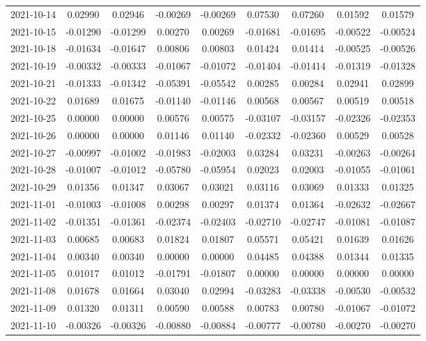\begin{footnotesize}
\begin{longtable}{lcccccccc}
2021-10-14 & 0.02990 & 0.02946 & -0.00269 & -0.00269 & 0.07530 & 0.07260 & 0.01592 & 0.01579 \\
2021-10-15 & -0.01290 & -0.01299 & 0.00270 & 0.00269 & -0.01681 & -0.01695 & -0.00522 & -0.00524 \\
2021-10-18 & -0.01634 & -0.01647 & 0.00806 & 0.00803 & 0.01424 & 0.01414 & -0.00525 & -0.00526 \\
2021-10-19 & -0.00332 & -0.00333 & -0.01067 & -0.01072 & -0.01404 & -0.01414 & -0.01319 & -0.01328 \\
2021-10-21 & -0.01333 & -0.01342 & -0.05391 & -0.05542 & 0.00285 & 0.00284 & 0.02941 & 0.02899 \\
2021-10-22 & 0.01689 & 0.01675 & -0.01140 & -0.01146 & 0.00568 & 0.00567 & 0.00519 & 0.00518 \\
2021-10-25 & 0.00000 & 0.00000 & 0.00576 & 0.00575 & -0.03107 & -0.03157 & -0.02326 & -0.02353 \\
2021-10-26 & 0.00000 & 0.00000 & 0.01146 & 0.01140 & -0.02332 & -0.02360 & 0.00529 & 0.00528 \\
2021-10-27 & -0.00997 & -0.01002 & -0.01983 & -0.02003 & 0.03284 & 0.03231 & -0.00263 & -0.00264 \\
2021-10-28 & -0.01007 & -0.01012 & -0.05780 & -0.05954 & 0.02023 & 0.02003 & -0.01055 & -0.01061 \\
2021-10-29 & 0.01356 & 0.01347 & 0.03067 & 0.03021 & 0.03116 & 0.03069 & 0.01333 & 0.01325 \\
2021-11-01 & -0.01003 & -0.01008 & 0.00298 & 0.00297 & 0.01374 & 0.01364 & -0.02632 & -0.02667 \\
2021-11-02 & -0.01351 & -0.01361 & -0.02374 & -0.02403 & -0.02710 & -0.02747 & -0.01081 & -0.01087 \\
2021-11-03 & 0.00685 & 0.00683 & 0.01824 & 0.01807 & 0.05571 & 0.05421 & 0.01639 & 0.01626 \\
2021-11-04 & 0.00340 & 0.00340 & 0.00000 & 0.00000 & 0.04485 & 0.04388 & 0.01344 & 0.01335 \\
2021-11-05 & 0.01017 & 0.01012 & -0.01791 & -0.01807 & 0.00000 & 0.00000 & 0.00000 & 0.00000 \\
2021-11-08 & 0.01678 & 0.01664 & 0.03040 & 0.02994 & -0.03283 & -0.03338 & -0.00530 & -0.00532 \\
2021-11-09 & 0.01320 & 0.01311 & 0.00590 & 0.00588 & 0.00783 & 0.00780 & -0.01067 & -0.01072 \\
2021-11-10 & -0.00326 & -0.00326 & -0.00880 & -0.00884 & -0.00777 & -0.00780 & -0.00270 & -0.00270 \\

\end{longtable}
\end{footnotesize}
